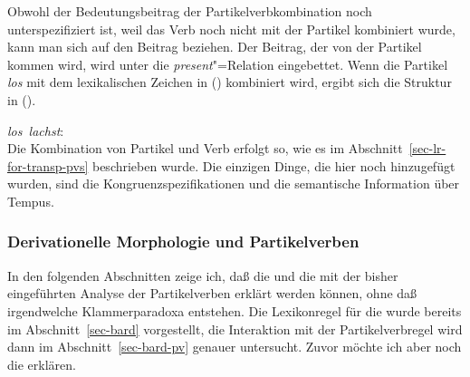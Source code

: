 \noindent
Obwohl der Bedeutungsbeitrag der Partikelverbkombination  noch unterspezifiziert
ist, weil das Verb noch nicht mit der Partikel kombiniert wurde, kann man sich
auf den Beitrag beziehen. Der Beitrag, der von der Partikel kommen wird, wird unter
die \emph{present}"=Relation eingebettet. Wenn die Partikel \emph{los}
mit dem lexikalischen Zeichen in () kombiniert wird, ergibt sich die Struktur in ().

\eas
\mbox{\emph{los lachst}:}\\
\zs
Die Kombination von Partikel und Verb erfolgt so, wie es im Abschnitt~\ref{sec-lr-for-transp-pvs}
beschrieben wurde. Die einzigen Dinge, die hier noch hinzugefügt wurden, sind die
Kongruenzspezifikationen und die semantische Information über Tempus.



\subsubsection{Derivationelle Morphologie und Partikelverben}
\label{sec-derivation-hpsg}

In den folgenden Abschnitten zeige ich, daß die \geen und die \bard
mit der bisher eingeführten Analyse der Partikelverben erklärt werden können,
ohne daß irgendwelche Klammerparadoxa entstehen. Die Lexikonregel für die
\bard wurde bereits im Abschnitt~\ref{sec-bard} vorgestellt, die Interaktion mit der
Partikelverbregel wird dann im Abschnitt~\ref{sec-bard-pv} genauer untersucht.
Zuvor möchte ich aber noch die \geen erklären.


